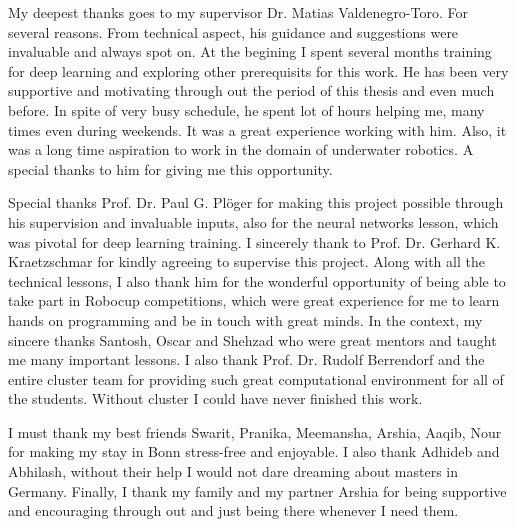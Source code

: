 \documentclass[thesis]{mas_report}
\begin{document}
\begin{acknowledgements}
 My deepest thanks goes to my supervisor Dr. Matias Valdenegro-Toro. For several reasons. From technical aspect, his guidance and suggestions were invaluable and always spot on.
 At the begining I spent several months training for deep learning and exploring other prerequisits for this work. He has been very supportive and motivating through out the period of this thesis and even much before.
 In spite of very busy schedule, he spent lot of hours helping me, many times even during weekends. It was a great experience working with him. Also, it was a long time aspiration to work in the domain of underwater robotics. 
 A special thanks to him for giving me this opportunity.
 
 Special thanks Prof. Dr. Paul G. Pl\"oger for making this project possible through his supervision and invaluable inputs, also for the neural networks lesson, which was pivotal for deep learning training.
 I sincerely thank to Prof. Dr. Gerhard K. Kraetzschmar for kindly agreeing to supervise this project. Along with all the technical lessons, 
 I also thank him for the wonderful opportunity of being able to take part in Robocup competitions, which were great experience for me to learn hands on programming and be in touch with great minds. In the context, 
 my sincere thanks Santosh, Oscar and Shehzad who were great mentors and taught me many important lessons. I also thank Prof. Dr. Rudolf Berrendorf and the entire cluster team for providing such great computational environment 
 for all of the students. Without cluster I could have never finished this work.
 
 I must thank my best friends Swarit, Pranika, Meemansha, Arshia, Aaqib, Nour for making my stay in Bonn stress-free and enjoyable. I also thank Adhideb and Abhilash, without their help I would not dare dreaming about masters in Germany.
 Finally, I thank my family and my partner Arshia for being supportive and encouraging through out and just being there whenever I need them. 
  
\end{acknowledgements}


\tableofcontents
\listoffigures
\listoftables

\end{document}
